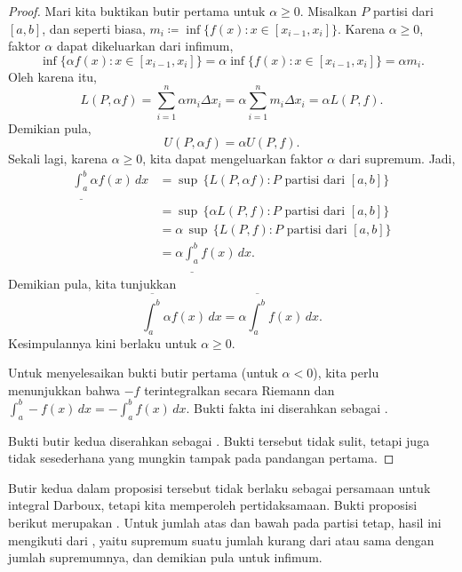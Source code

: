 \begin{proof}
\pagebreak[2]
Mari kita buktikan butir pertama untuk $\alpha \geq 0$.
Misalkan $P$ partisi dari $[a,b]$, dan seperti biasa,
$m_i \coloneqq \inf \bigl\{ f(x) : x \in [x_{i-1},x_i] \bigr\}$.
Karena $\alpha \geq 0$, faktor $\alpha$ dapat dikeluarkan
dari infimum,
\begin{equation*}
\inf \bigl\{ \alpha f(x) : x \in [x_{i-1},x_i] \bigr\}
=
\alpha \inf \bigl\{ f(x) : x \in [x_{i-1},x_i] \bigr\} = \alpha m_i .
\end{equation*}
Oleh karena itu,
\begin{equation*}
L(P,\alpha f) =
\sum_{i=1}^n \alpha m_i \Delta x_i = \alpha \sum_{i=1}^n m_i \Delta x_i = \alpha
L(P,f).
\end{equation*}
Demikian pula,
\begin{equation*}
U(P,\alpha f) = \alpha U(P,f) .
\end{equation*}
Sekali lagi, karena $\alpha \geq 0$, kita
dapat mengeluarkan faktor $\alpha$ dari supremum.  Jadi,
\begin{equation*}
\begin{split}
\underline{\int_a^b} \alpha f(x)\,dx & =
\sup \, \bigl\{ L(P,\alpha f) : P \text{ partisi dari } [a,b] \bigr\}
\\
& =
\sup \, \bigl\{ \alpha L(P,f) : P \text{ partisi dari } [a,b] \bigr\}
\\
& =
\alpha \,
\sup \, \bigl\{ L(P,f) : P \text{ partisi dari } [a,b] \bigr\}
\\
& =
\alpha
\underline{\int_a^b} f(x)\,dx .
\end{split}
\end{equation*}
Demikian pula, kita tunjukkan
\begin{equation*}
\overline{\int_a^b} \alpha f(x)\,dx
=
\alpha
\overline{\int_a^b} f(x)\,dx .
\end{equation*}
Kesimpulannya kini berlaku untuk $\alpha \geq 0$.

Untuk menyelesaikan bukti butir pertama (untuk $\alpha < 0$), kita perlu menunjukkan
bahwa $-f$ terintegralkan secara Riemann dan
$\int_a^b - f(x)\,dx =
-
\int_a^b f(x)\,dx$.  Bukti fakta ini diserahkan sebagai
.

Bukti butir kedua diserahkan sebagai
.
Bukti tersebut tidak sulit, tetapi juga tidak sesederhana
yang mungkin tampak pada pandangan pertama.
\end{proof}

Butir kedua dalam proposisi tersebut tidak berlaku sebagai
persamaan untuk integral Darboux, tetapi kita memperoleh pertidaksamaan.
Bukti proposisi berikut merupakan .
Untuk jumlah atas dan bawah pada partisi tetap, hasil ini mengikuti dari ,
yaitu supremum suatu jumlah kurang dari atau sama dengan jumlah
supremumnya, dan demikian pula untuk infimum.

